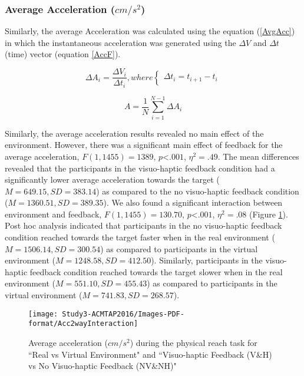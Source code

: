 \subsubsection{Average Acceleration ($cm/s^2$)}
Similarly, the average Acceleration was calculated using the equation (\ref{AvgAcc}) in which the instantaneous acceleration was generated using the $\Delta V$ and $\Delta t$ (time) vector (equation \ref{AccF}).


\begin{equation} \label{AccF}
\Delta A_i = \frac{\Delta V_i}{\Delta t_i}, where
\begin{cases}
\Delta t_i = t_{i+1}-t_{i}
\end{cases}
\end{equation}

\begin{equation} \label{AvgAcc}
A = \frac{1}{N}\sum_{i=1}^{N-1}\Delta A_i 
\end{equation}

Similarly, the average acceleration results revealed no main effect of the environment. However, there was a significant main effect of feedback for the average acceleration, $F(1,1455)=1389$, $p$\textless$.001$, $\eta^{2}=.49$. The mean differences revealed that the participants in the visuo-haptic feedback condition had a significantly lower average acceleration towards the target ($M=649.15, SD=383.14$) as compared to the no visuo-haptic feedback condition ($M=1360.51, SD=389.35$). We also found a significant interaction between environment and feedback, $F(1,1455)=130.70$, $p$\textless$.001$, $\eta^{2}=.08$ (Figure \ref{fig:avgAcc2way}). Post hoc analysis indicated that participants in the no visuo-haptic feedback condition reached towards the target faster when in the real environment ($M=1506.14, SD=300.54$) as compared to participants in the virtual environment ($M=1248.58, SD=412.50$). Similarly, participants in the visuo-haptic feedback condition reached towards the target slower when in the real environment ($M=551.10, SD=455.43$) as compared to participants in the virtual environment ($M=741.83, SD=268.57$). 


\begin{figure}
	\centering
	\texttt{[image: Study3-ACMTAP2016/Images-PDF-format/Acc2wayInteraction]}
	\caption{Average acceleration ($cm/s^{2}$) during the physical reach task for ``Real vs Virtual Environment" and ``Visuo-haptic Feedback (V\&H) vs No Visuo-haptic Feedback (NV\&NH)"}
	\label{fig:avgAcc2way}
\end{figure}


